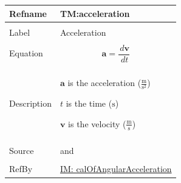 \documentclass[12pt]{article}
\begin{document}
\vspace{\baselineskip}
\noindent
\begin{minipage}{\textwidth}
\begin{tabular}{>{\raggedright}p{}>{\raggedright\arraybackslash}p{}}
\toprule \textbf{Refname} & \textbf{TM:acceleration}
\label{TM:acceleration}
\\ \midrule \\
Label & Acceleration
        
\\ \midrule \\
Equation & \begin{displaymath}
           \mathbf{a}=\frac{\,d\mathbf{v}}{\,dt}
           \end{displaymath}
\\ \midrule \\
Description & \begin{symbDescription}
              \item{$\mathbf{a}$ is the acceleration ($\frac{\text{m}}{\text{s}^{2}}$)}
              \item{$t$ is the time (${\text{s}}$)}
              \item{$\mathbf{v}$ is the velocity ($\frac{\text{m}}{\text{s}}$)}
              \end{symbDescription}
\\ \midrule \\
Source & \cite{accelerationWiki} and \cite[(pg. 7)]{hibbeler2004}
         
\\ \midrule \\
RefBy & \hyperref[IM:calOfAngularAcceleration]{IM: calOfAngularAcceleration}
        
\\ \bottomrule
\end{tabular}
\end{minipage}
\vspace{\baselineskip}
\noindent
\end{document}
